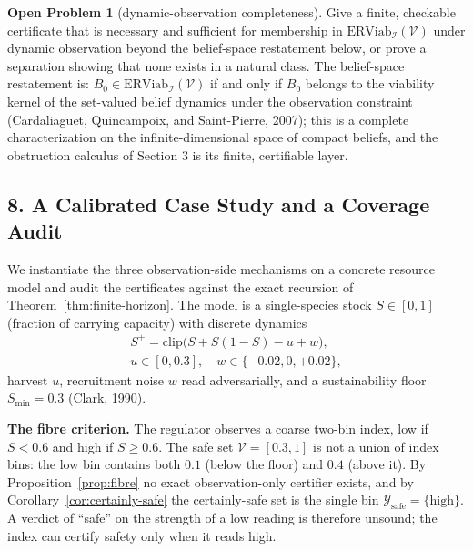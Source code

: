 \documentclass[10pt,twocolumn]{article}
\theoremstyle{definition}
\newtheorem{openproblem}{Open Problem}
\begin{document}
\begin{openproblem}[dynamic-observation completeness]\label{op:dynamic}
Give a finite, checkable certificate that is necessary and sufficient for membership in \(\mathrm{ERViab}_{\mathcal{I}}(\mathcal{V})\) under dynamic observation beyond the belief-space restatement below, or prove a separation showing that none exists in a natural class. The belief-space restatement is: \(B_{0} \in \mathrm{ERViab}_{\mathcal{I}}(\mathcal{V})\) if and only if \(B_{0}\) belongs to the viability kernel of the set-valued belief dynamics under the observation constraint (Cardaliaguet, Quincampoix, and Saint-Pierre, 2007); this is a complete characterization on the infinite-dimensional space of compact beliefs, and the obstruction calculus of Section 3 is its finite, certifiable layer.
\end{openproblem}

\subsection{8. A Calibrated Case Study and a Coverage Audit}\label{case-study}

We instantiate the three observation-side mechanisms on a concrete resource model and audit the certificates against the exact recursion of Theorem~\ref{thm:finite-horizon}. The model is a single-species stock \(S \in [0,1]\) (fraction of carrying capacity) with discrete dynamics
\[
\begin{gathered}
S^{+} = \mathrm{clip}\bigl(S + S(1-S) - u + w\bigr),\\
u \in [0, 0.3],\quad w \in \{-0.02, 0, +0.02\},
\end{gathered}
\]
harvest \(u\), recruitment noise \(w\) read adversarially, and a sustainability floor \(S_{\min} = 0.3\) (Clark, 1990).

\textbf{The fibre criterion.} The regulator observes a coarse two-bin index, low if \(S < 0.6\) and high if \(S \ge 0.6\). The safe set \(\mathcal{V} = [0.3, 1]\) is not a union of index bins: the low bin contains both \(0.1\) (below the floor) and \(0.4\) (above it). By Proposition~\ref{prop:fibre} no exact observation-only certifier exists, and by Corollary~\ref{cor:certainly-safe} the certainly-safe set is the single bin \(\mathcal{Y}_{\mathrm{safe}} = \{\text{high}\}\). A verdict of ``safe'' on the strength of a low reading is therefore unsound; the index can certify safety only when it reads high.
\end{document}

